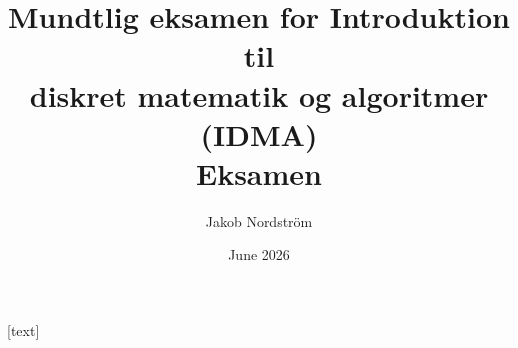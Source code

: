 %
%

\title[IDMA Oral Exam (Version \oralexamnumber)]
{Mundtlig eksamen for Introduktion til \\
 diskret matematik og algoritmer (IDMA) \\
 Eksamen \oralexamnumber}

\author[Jakob Nordström]{Jakob Nordström}


\date{June 2026}

\subject{IDMA oral exam June 2026}




  
\usepackage{algorithm2e}
\usepackage{xcolor}

\usepackage{bm}  

\usepackage{lmodern}  

\usepackage{verbatim}

%    

%
%


[text] 

\usepackage[normalem]{ulem}

